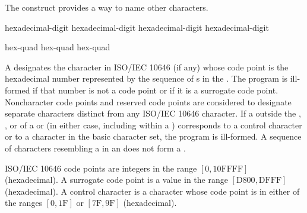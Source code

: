 \documentclass{wg21}
\begin{document}
\pnum
The  construct provides a way to name
other characters.

\begin{bnf}
    \br
    hexadecimal-digit hexadecimal-digit hexadecimal-digit hexadecimal-digit
\end{bnf}

\begin{bnf}
    \br
     hex-quad\br
     hex-quad hex-quad
\end{bnf}

A 
designates the character in ISO/IEC 10646 (if any)
whose code point is the hexadecimal number represented by
the sequence of s
in the .
The program is ill-formed if that number is not a code point
or if it is a surrogate code point.
Noncharacter code points and reserved code points
are considered to designate separate characters distinct from
any ISO/IEC 10646 character.
If a  outside
the , , or
 of
a  or 
(in either case, including within a )
corresponds to a control character or
to a character in the basic
 character set, the program is ill-formed.
    A sequence of characters resembling a  in an
     does not form a
    .
\begin{note}
    ISO/IEC 10646 code points are integers in the range $[0, \mathrm{10FFFF}]$ (hexadecimal).
    A surrogate code point is a value in the range $[\mathrm{D800}, \mathrm{DFFF}]$ (hexadecimal).
    A control character is a character whose code point is
    in either of the ranges $[0, \mathrm{1F}]$ or $[\mathrm{7F}, \mathrm{9F}]$ (hexadecimal).
\end{note}
\end{document}
